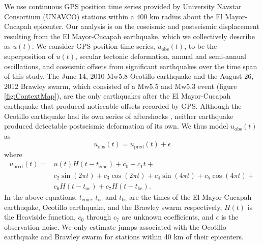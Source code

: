 \documentclass[12pt]{article}
\begin{document}
We use continuous GPS position time series provided by University Navstar Consortium (UNAVCO) stations within a 400 km radius about the El Mayor-Cucapah epicenter. Our analysis is on the coseismic and postseismic displacement resulting from the El Mayor-Cucapah earthquake, which we collectively describe as $u(t)$. We consider GPS position time series, $u_\mathrm{obs}(t)$, to be the superposition of $u(t)$, secular tectonic deformation, annual and semi-annual oscillations, and coseismic offsets from significant earthquakes over the time span of this study.  The June 14, 2010 Mw5.8 Ocotillo earthquake and the August 26, 2012 Brawley swarm, which consisted of a Mw5.5 and Mw5.3 event (figure \ref{fig:ContextMap}), are the only earthquakes after the El Mayor-Cucapah earthquake that produced noticeable offsets recorded by GPS. Although the Ocotillo earthquake had its own series of aftershocks \citep{Hauksson2011}, neither earthquake produced detectable postseismic deformation of its own. We thus model $u_\mathrm{obs}(t)$ as 
\begin{equation}
  u_\mathrm{obs}(t) = u_\mathrm{pred}(t) + \epsilon
\end{equation}
where
\begin{equation}\label{TimeSeriesModel}
  \begin{split}  
    u_\mathrm{pred}(t) = &u(t)H(t-t_\mathrm{emc}) + c_0 + c_1t + \\
                         &c_2\sin(2\pi t) + c_3\cos(2\pi t) + c_4\sin(4\pi t) + c_5\cos(4\pi t) + \\
                         &c_6H(t-t_\mathrm{oc}) + c_7H(t-t_\mathrm{bs}).
  \end{split}
\end{equation}
In the above equations, $t_\mathrm{emc}$, $t_\mathrm{oc}$ and $t_\mathrm{bs}$ are the times of the El Mayor-Cucapah earthuqake, Ocotillo earthquake, and the Brawley swarm respectively, $H(t)$ is the Heaviside function, $c_0$ through $c_7$ are unknown coefficients, and $\epsilon$ is the observation noise. We only estimate jumps associated with the Ocotillo earthquake and Brawley swarm for stations within 40 km of their epicenters. 
\end{document}
